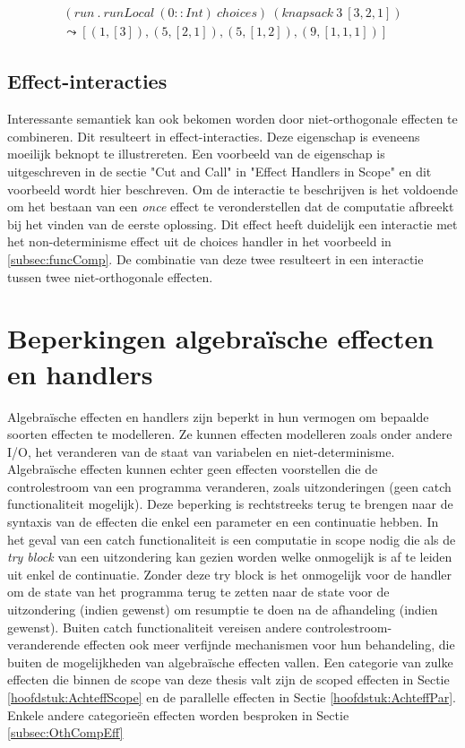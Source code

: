 \begin{equation}
    \begin{split}
        (run \  . \   runLocal \  (0 :: Int) \   choices) \  (knapsack \   3 \ 
  [3,2,1]) \\
        \leadsto [(1,[3]),(5,[2,1]),(5,[1,2]),(9,[1,1,1])]
    \end{split}
\end{equation}


\subsection{Effect-interacties}
\label{subsec:effInter}
Interessante semantiek kan ook bekomen worden door niet-orthogonale effecten te combineren. Dit resulteert in effect-interacties. Deze eigenschap is eveneens moeilijk beknopt te illustrereten. Een voorbeeld van de eigenschap is uitgeschreven in de sectie "Cut and Call" in "Effect Handlers in Scope"\cite{Wu2014} en dit voorbeeld wordt hier beschreven. Om de interactie te beschrijven is het voldoende om het bestaan van een \emph{once} effect te veronderstellen dat de computatie afbreekt bij het vinden van de eerste oplossing. Dit effect heeft duidelijk een interactie met het non-determinisme effect uit de choices handler in het voorbeeld in \ref{subsec:funcComp}. De combinatie van deze twee resulteert in een interactie tussen twee niet-orthogonale effecten. 

\section{Beperkingen algebraïsche effecten en handlers}
Algebraïsche effecten en handlers zijn beperkt in hun vermogen om bepaalde soorten effecten te modelleren. Ze kunnen effecten modelleren zoals onder andere I/O, het veranderen van de staat van variabelen en niet-determinisme. Algebraïsche effecten kunnen echter geen effecten voorstellen die de controlestroom van een programma veranderen, zoals uitzonderingen (geen catch functionaliteit mogelijk). Deze beperking is rechtstreeks terug te brengen naar de syntaxis van de effecten die enkel een parameter en een continuatie hebben. In het geval van een catch functionaliteit is een computatie in scope nodig die als de \emph{try block} van een uitzondering kan gezien worden welke onmogelijk is af te leiden uit enkel de continuatie. Zonder deze try block is het onmogelijk voor de handler om de state van het programma terug te zetten naar de state voor de uitzondering (indien gewenst) om resumptie te doen na de afhandeling (indien gewenst). Buiten catch functionaliteit vereisen andere controlestroom-veranderende effecten ook meer verfijnde mechanismen voor hun behandeling, die buiten de mogelijkheden van algebraïsche effecten vallen. Een categorie van zulke effecten die binnen de scope van deze thesis valt zijn de scoped effecten in Sectie \ref{hoofdstuk:AchteffScope} en de parallelle effecten in Sectie \ref{hoofdstuk:AchteffPar}. Enkele andere categorieën effecten worden besproken in Sectie \ref{subsec:OthCompEff}

